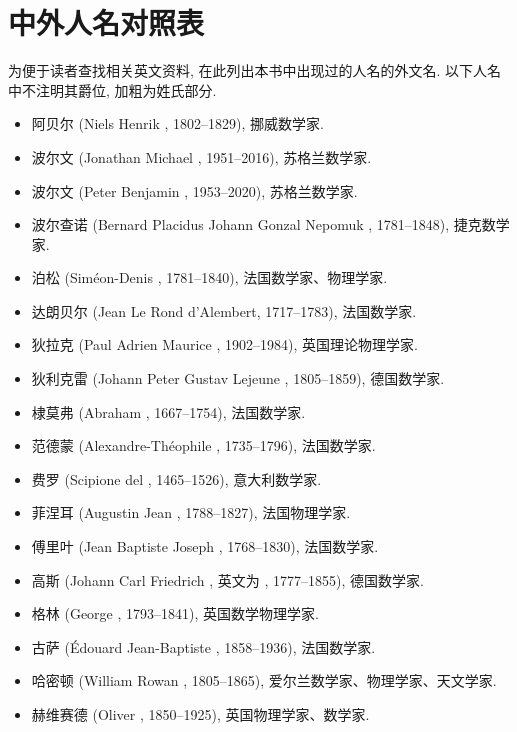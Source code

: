 \chapter{中外人名对照表}

为便于读者查找相关英文资料, 在此列出本书中出现过的人名的外文名.
以下人名中不注明其爵位, 加粗为姓氏部分.

\begin{itemize}
  \item 阿贝尔 (Niels Henrik , 1802--1829), 挪威数学家.
  \item 波尔文 (Jonathan Michael , 1951--2016), 苏格兰数学家.
  \item 波尔文 (Peter Benjamin , 1953--2020), 苏格兰数学家.
  \item 波尔查诺 (Bernard Placidus Johann Gonzal Nepomuk , 1781--1848), 捷克数学家.
  \item 泊松 (Siméon-Denis , 1781--1840), 法国数学家、物理学家.
  \item 达朗贝尔 (Jean Le Rond d'Alembert, 1717--1783), 法国数学家.
  \item 狄拉克 (Paul Adrien Maurice , 1902--1984), 英国理论物理学家.
  \item 狄利克雷 (Johann Peter Gustav Lejeune , 1805--1859), 德国数学家.
  \item 棣莫弗 (Abraham , 1667--1754), 法国数学家.
  \item 范德蒙 (Alexandre-Théophile , 1735--1796), 法国数学家.
  \item 费罗 (Scipione del , 1465--1526), 意大利数学家.
  \item 菲涅耳 (Augustin Jean , 1788--1827), 法国物理学家.
  \item 傅里叶 (Jean Baptiste Joseph , 1768--1830), 法国数学家.
  \item 高斯 (Johann Carl Friedrich , 英文为 , 1777--1855), 德国数学家.
  \item 格林 (George , 1793--1841), 英国数学物理学家.
  \item 古萨 (Édouard Jean-Baptiste , 1858--1936), 法国数学家.
  \item 哈密顿 (William Rowan , 1805--1865), 爱尔兰数学家、物理学家、天文学家.
  \item 赫维赛德 (Oliver , 1850--1925), 英国物理学家、数学家.

\end{itemize}

